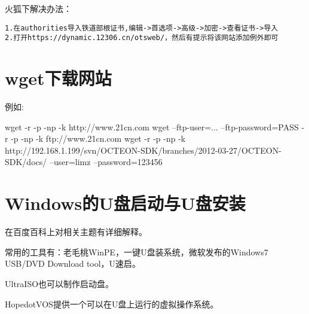 火狐下解决办法：
\begin{verbatim}
1.在authorities导入铁道部根证书,编辑->首选项->高级->加密->查看证书->导入
2.打开https://dynamic.12306.cn/otsweb/，然后有提示将该网站添加例外即可
\end{verbatim}
\section{wget下载网站}
例如:
\begin{shellcmd}
wget -r -p -np -k http://www.21cn.com
wget --ftp-user=... --ftp-password=PASS  -r -p -np -k ftp://www.21cn.com
wget -r -p -np -k http://192.168.1.199/svn/OCTEON-SDK/branches/2012-03-27/OCTEON-SDK/docs/ --user=limz --password=123456
\end{shellcmd}


\section{Windows的U盘启动与U盘安装}
在百度百科上对相关主题有详细解释。

常用的工具有：老毛桃WinPE，一键U盘装系统，微软发布的Windows7 USB/DVD Download tool，U速启。

UltraISO也可以制作启动盘。 

HopedotVOS提供一个可以在U盘上运行的虚拟操作系统。
